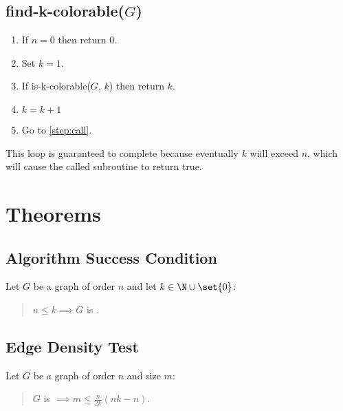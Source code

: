 \subsection{find-k-colorable(\(G\))}

\begin{enumerate}
\item \label{step:null} If \(n=0\) then return \(0\).

\item \label{step:init} Set \(k=1\).  

\item \label{step:call} If is-k-colorable(\(G\), \(k\)) then return \(k\).

\item \label{step:incr} \(k=k+1\)

\item \label{step:loop} Go to \ref{step:call}.
\end{enumerate}

This loop is guaranteed to complete because eventually \(k\) wiill exceed \(n\), which will cause the called subroutine to
return true.

\section{Theorems}

\subsection{Algorithm Success Condition}

\begin{proposition}
  \label{prop:success}
  Let \(G\) be a graph of order \(n\) and let \(k\in\N\cup\set{0}\):
  \begin{quote}
    \(n\le k\implies G\) is .
  \end{quote}
\end{proposition}

\subsection{Edge Density Test}

\begin{lemma}
  \label{lem:density}
  Let \(G\) be a graph of order \(n\) and size \(m\):
  \begin{quote}
    \(G\) is  \(\displaystyle\implies m\le\frac{n}{2k}(nk-n)\).
  \end{quote}
\end{lemma}


